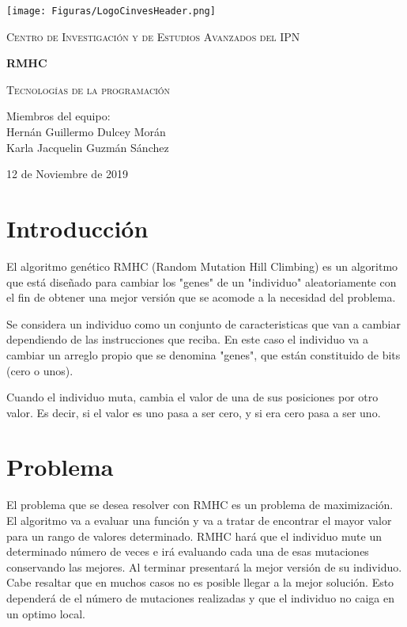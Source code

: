 \documentclass[10pt]{report}
\begin{document}
\begin{titlepage}
	\centering
	\texttt{[image: Figuras/LogoCinvesHeader.png]}\par\vspace{2cm}
	{\scshape\LARGE Centro de Investigación y de Estudios Avanzados del IPN\par}
	\vspace{2cm}	
	{\huge\bfseries RMHC \par}
	\vspace{1.5cm}
	{\scshape\Large Tecnologías de la programación\par}
	\vspace{2cm}
	{\Large Miembros del equipo: \\Hernán Guillermo Dulcey Morán \\Karla Jacquelin Guzmán Sánchez\par}
	\vfill

	{\large 12 de Noviembre de 2019 \par}
\end{titlepage}


\section*{Introducción}

El algoritmo genético RMHC (Random Mutation Hill Climbing) es un algoritmo que está diseñado para cambiar los "genes" de un "individuo" aleatoriamente con el fin de obtener una mejor versión que se acomode a la necesidad del problema.

Se considera un individuo como un conjunto de caracteristicas que van a cambiar dependiendo de las instrucciones que reciba. En este caso el individuo va a cambiar un arreglo propio que se denomina "genes", que están constituido de bits (cero o unos). 

Cuando el individuo muta, cambia el valor de una de sus posiciones por otro valor. Es decir, si el valor es uno pasa a ser cero, y si era cero pasa a ser uno.

\section*{Problema}

El problema que se desea resolver con RMHC es un problema de maximización. El algoritmo va a evaluar una función y va a tratar de encontrar el mayor valor para un rango de valores determinado. RMHC hará que el individuo mute un determinado número de veces e irá evaluando cada una de esas mutaciones conservando las mejores. Al terminar presentará la mejor versión de su individuo. Cabe resaltar que en muchos casos no es posible llegar a la mejor solución. Esto dependerá de el número de mutaciones realizadas y que el individuo no caiga en un optimo local.
\end{document}
